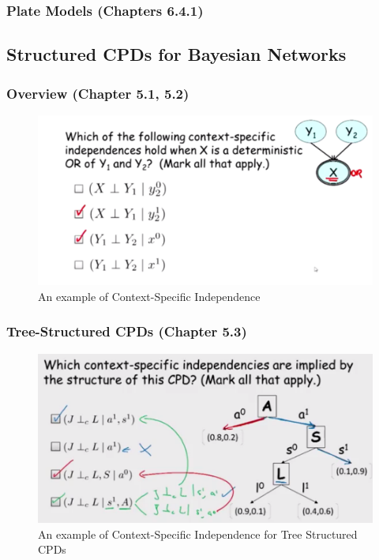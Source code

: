 \documentclass[12pt]{article}
\numberwithin{equation}{section}
\begin{document}
\subsubsection{Plate Models (Chapters 6.4.1)}

\subsection{Structured CPDs for Bayesian Networks}
\subsubsection{Overview (Chapter 5.1, 5.2)}
\begin{figure}[H]
	\includegraphics[width=\linewidth]{PGMpics/OverviewStructuredCPD.png}
	\caption{An example of Context-Specific Independence}
	\label{fig:OverviewStructuredCPD}
\end{figure}
\subsubsection{Tree-Structured CPDs (Chapter 5.3)}
\begin{figure}[H]
	\includegraphics[width=\linewidth]{PGMpics/TreeStructuredCPDs.png}
	\caption{An example of Context-Specific Independence for Tree Structured CPDs}
	\label{fig:TreeStructuredCPDs}
\end{figure}
\end{document}
